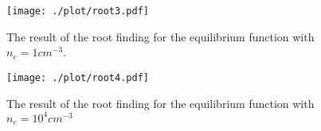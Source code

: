 \begin{figure}[!h]
    \centering
    \texttt{[image: ./plot/root3.pdf]}
    \caption{The result of the root finding for the equilibrium function with $n_e = 1 cm^{-3}$.}
    \label{fig:root3}
\end{figure}

\begin{figure}[!h]
    \centering
    \texttt{[image: ./plot/root4.pdf]}
    \caption{The result of the root finding for the equilibrium function with $n_e = 10^4 cm^{-3}$}
    \label{fig:root4}
\end{figure}